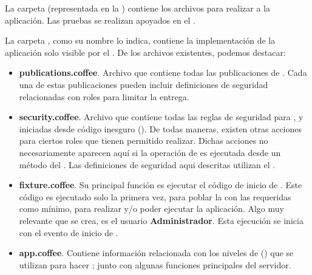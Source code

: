 

La carpeta \folderTests (representada en la ) contiene los archivos para realizar \testingCPT a la aplicación. Las pruebas se realizan apoyados en el \packageAS \sanjoJasminePackage.



La carpeta \serverFolder, como su nombre lo indica, contiene la implementación de la aplicación solo visible por el \serverSideAS. De los archivos existentes, podemos destacar:

\begin{itemize}
	\item
		\textbf{publications.coffee}. Archivo que contiene todas las publicaciones de \documentsDB. Cada una de estas publicaciones pueden incluir definiciones de seguridad relacionadas con roles para limitar la entrega.
	\item
	 	\textbf{security.coffee}. Archivo que contiene todas las reglas de seguridad para \insertsDB, \updatesDB y \removesDB iniciadas desde código inesguro (\clientsAS). De todas maneras, existen otras acciones para ciertos roles que tienen permitido realizar. Dichas acciones no necesariamente aparecen aquí si la operación de \dataBaseDB es ejecutada desde un método del \serverAS. Las definiciones de seguridad aqui descritas utilizan el \packageAS \securityPackage.
 	\item
	 	\textbf{fixture.coffee}. Su principal función es ejecutar el código de inicio de \fixturesPC. Este código es ejecutado solo la primera vez, para poblar la \dataBaseDB con las \collectionsMETEOR requeridas como mínimo, para realizar \testingCPT y/o poder ejecutar la aplicación. Algo muy relevante que se crea, es el usuario \textbf{Administrador}.  Esta ejecución se inicia con el evento de inicio de \meteorNAME.
	\item
	 	\textbf{app.coffee}. Contiene información relacionada con los niveles de \bunyanNAME (\packageAS \bunyanPackage) que se utilizan para hacer \loggingCPT; junto con algunas funciones principales del servidor.
\end{itemize}


